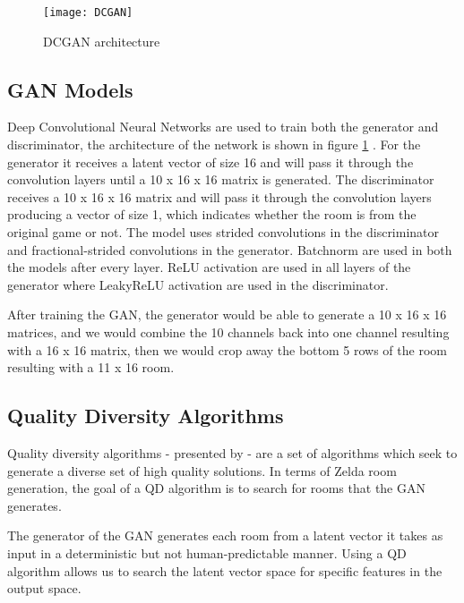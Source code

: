 \documentclass{article}
\begin{document}
\begin{figure}[tb]
\vskip 5mm
\begin{center}
\centerline{\texttt{[image: DCGAN]}}
\caption{DCGAN architecture}
\label{fig:dcgan}
\end{center}
\vskip -5mm
\end{figure} 
\subsection{GAN Models}

Deep Convolutional Neural Networks are used to train both the generator and discriminator, the architecture of the network is shown in figure \ref{fig:dcgan} . For the generator it receives a latent vector of size 16 and will pass it through the convolution layers until a 10 x 16 x 16 matrix is generated. The discriminator receives a 10 x 16 x 16 matrix and will pass it through the convolution layers producing a vector of size 1, which indicates whether the room is from the original game or not. The model uses strided convolutions in the discriminator and fractional-strided convolutions in the generator. Batchnorm are used in both the models after every layer. ReLU activation are used in all layers of the generator where LeakyReLU activation are used in the discriminator. %

After training the GAN, the generator would be able to generate a 10 x 16 x 16 matrices, and we would combine the 10 channels back into one channel resulting with a 16 x 16 matrix, then we would crop away the bottom 5 rows of the room resulting with a 11 x 16 room.

\subsection{Quality Diversity Algorithms}
Quality diversity algorithms - presented by \cite{Gravina2019} - are a set of algorithms which seek to generate a diverse set of high quality solutions. In terms of Zelda room generation, the goal of a QD algorithm is to search for rooms that the GAN generates.

The generator of the GAN generates each room from a latent vector it takes as input in a deterministic but not human-predictable manner. Using a QD algorithm allows us to search the latent vector space for specific features in the output space.
\end{document}
